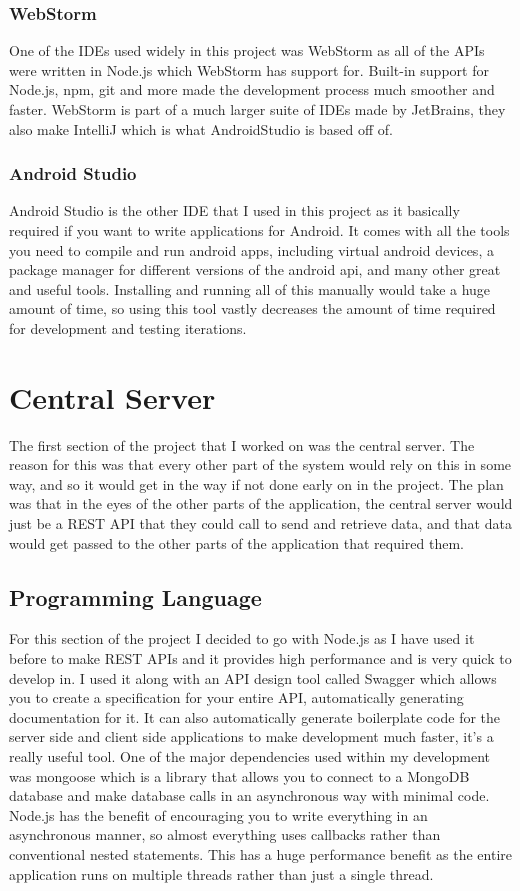 \subsubsection*{WebStorm}
One of the IDEs used widely in this project was WebStorm as all of the APIs were written in Node.js which WebStorm has support for. Built-in support for Node.js, npm, git and more made the development process much smoother and faster. WebStorm is part of a much larger suite of IDEs made by JetBrains, they also make IntelliJ which is what AndroidStudio is based off of.

\subsubsection*{Android Studio}
Android Studio is the other IDE that I used in this project as it basically required if you want to write applications for Android. It comes with all the tools you need to compile and run android apps, including virtual android devices, a package manager for different versions of the android api, and many other great and useful tools. Installing and running all of this manually would take a huge amount of time, so using this tool vastly decreases the amount of time required for development and testing iterations.

\section{Central Server}
The first section of the project that I worked on was the central server. The reason for this was that every other part of the system would rely on this in some way, and so it would get in the way if not done early on in the project. The plan was that in the eyes of the other parts of the application, the central server would just be a REST API that they could call to send and retrieve data, and that data would get passed to the other parts of the application that required them.

\subsection{Programming Language}
For this section of the project I decided to go with Node.js as I have used it before to make REST APIs and it provides high performance and is very quick to develop in. I used it along with an API design tool called Swagger which allows you to create a specification for your entire API, automatically generating documentation for it. It can also automatically generate boilerplate code for the server side and client side applications to make development much faster, it's a really useful tool. One of the major dependencies used within my development was mongoose which is a library that allows you to connect to a MongoDB database and make database calls in an asynchronous way with minimal code. Node.js has the benefit of encouraging you to write everything in an asynchronous manner, so almost everything uses callbacks rather than conventional nested statements. This has a huge performance benefit as the entire application runs on multiple threads rather than just a single thread.

